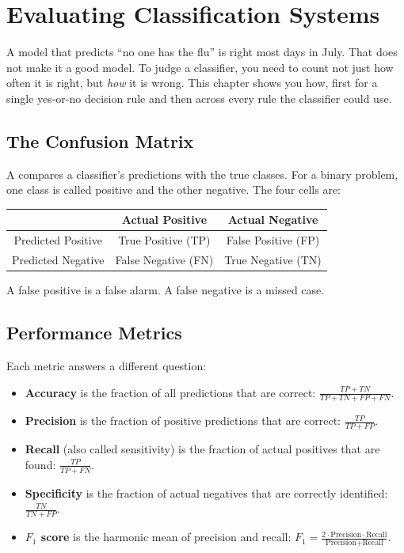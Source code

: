 \chapter{Evaluating Classification Systems}

A model that predicts ``no one has the flu'' is right most days in July. That
does not make it a good model. To judge a classifier, you need to count not just
how often it is right, but \emph{how} it is wrong. This chapter shows you how,
first for a single yes-or-no decision rule and then across every rule the
classifier could use.

\section{The Confusion Matrix}
A  compares a classifier's predictions with the true classes.
For a binary problem, one class is called positive and the other negative. The four cells are:

\begin{center}
\begin{tabular}{|c|c|c|}
\hline
 & Actual Positive & Actual Negative \\
\hline
Predicted Positive & True Positive (TP) & False Positive (FP) \\
\hline
Predicted Negative & False Negative (FN) & True Negative (TN) \\
\hline
\end{tabular}
\end{center}

A false positive is a false alarm. A false negative is a missed case.

\section{Performance Metrics}
Each metric answers a different question:
\begin{itemize}
\item \textbf{Accuracy} is the fraction of all predictions that are correct:
$\frac{TP + TN}{TP + TN + FP + FN}$.
\item \textbf{Precision} is the fraction of positive predictions that are correct:
$\frac{TP}{TP + FP}$.
\item \textbf{Recall} (also called sensitivity) is the fraction of actual positives that are found:
$\frac{TP}{TP + FN}$.
\item \textbf{Specificity} is the fraction of actual negatives that are correctly identified:
$\frac{TN}{TN + FP}$.
\item \textbf{$F_1$ score} is the harmonic mean of precision and recall:
$F_1 = \frac{2 \cdot \text{Precision} \cdot \text{Recall}}{\text{Precision} + \text{Recall}}$.
\end{itemize}

